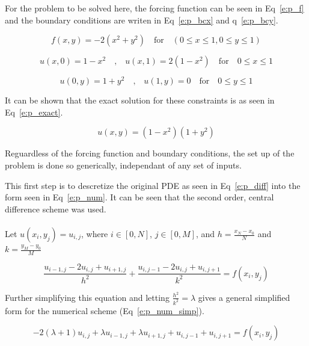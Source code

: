 \documentclass[]{aiaa-tc}%
\begin{document}
For the problem to be solved here, the forcing function can be seen in Eq~\ref{e:p_f}
and the boundary conditions are writen in Eq~\ref{e:p_bcx} and q~\ref{e:p_bcy}.

\begin{equation}
  \label{e:p_f}
  f(x,y) = -2(x^2 + y^2)\quad \textrm{for} \quad (0 \leq x \leq 1, 0 \leq y \leq 1)
\end{equation}

\begin{equation}
  \label{e:p_bcx}
  u(x,0) = 1 - x^2 \quad \textrm{,} \quad u(x,1) = 2(1 - x^2) \quad \textrm{for} \quad 0 \leq x \leq 1
\end{equation}

\begin{equation}
  \label{e:p_bcy}
  u(0,y) = 1 + y^2 \quad \textrm{,} \quad u(1,y) = 0 \quad \textrm{for} \quad 0 \leq y \leq 1
\end{equation}

It can be shown that the exact solution for these constraints is as seen in Eq~\ref{e:p_exact}.

\begin{equation}
  \label{e:p_exact}
  u(x,y) = (1 - x^2)(1 + y^2)
\end{equation}

Reguardless of the forcing function and boundary conditions, the set up of the
problem is done so generically, independant of any set of inputs.

This first step is to descretize the original PDE as seen in Eq~\ref{e:p_diff} into
the form seen in Eq~\ref{e:p_num}. It can be seen that the second order, central
difference scheme was used.
\\\\
Let $u(x_i,y_j) = u_{i,j}$, where $i \in [0,N]$, $j \in [0,M]$, and $h = \frac{x_N - x_0}{N}$ and $k = \frac{y_M - y_0}{M}$

\begin{equation}
  \label{e:p_num}
  \frac{u_{i-1,j} - 2u_{i,j} + u_{i+1,j}}{h^2} + \frac{u_{i,j-1} - 2u_{i,j} + u_{i,j+1}}{k^2} = f(x_i,y_j)
\end{equation}

Further simplifying this equation and letting $\frac{h^2}{k^2} = \lambda$ gives a
general simplified form for the numerical scheme (Eq~\ref{e:p_num_simp}).

\begin{equation}
  \label{e:p_num_simp}
  - 2(\lambda + 1)u_{i,j} + \lambda u_{i-1,j} + \lambda u_{i+1,j}  + u_{i,j-1} + u_{i,j+1} = f(x_i,y_j)
\end{equation}
\end{document}
